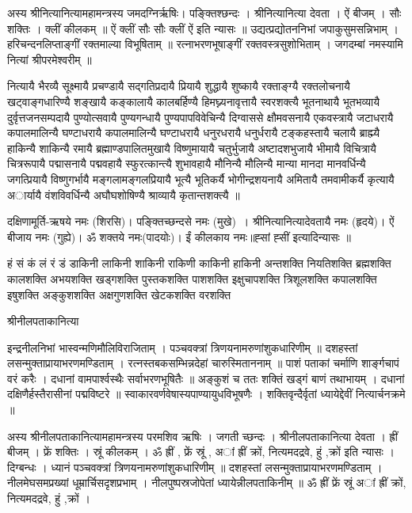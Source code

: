 अस्य श्रीनित्यानित्यामहामन्त्रस्य जमदग्निर्ऋषिः। पङ्क्तिश्छन्दः । श्रीनित्यानित्या देवता । ऐं बीजम् । सौः शक्तिः । क्लीं कीलकम् ॥
ऐं क्लीं सौः सौः क्लीं ऐं  इति न्यासः ॥
उद्यत्प्रद्योतननिभां जपाकुसुमसन्निभाम् । हरिचन्दनलिप्ताङ्गीं रक्तमाल्या विभूषिताम् ॥
रत्नाभरणभूषाङ्गीं रक्तवस्त्रसुशोभिताम् । जगदम्बां नमस्यामि नित्यां श्रीपरमेश्वरीम् ॥

नित्यायै भैरव्यै सूक्ष्मायै प्रचण्डायै सद्गतिप्रदायै प्रियायै शुद्धायै शुष्कायै रक्ताङ्ग्यै रक्तलोचनायै खट्वाङ्गधारिण्यै शङ्खायै कङ्कालायै कालबर्हिण्यै हिमघ्न्यनावृत्तायै स्वरशक्त्यै 
भूतनाथायै भूतभव्यायै दुर्वृत्तजनसम्पदायै पुण्योत्सवायै पुण्यगन्धायै पुण्यपापविवेचिन्यै दिग्वाससे क्षौमवसनायै एकवस्त्रायै जटाधरायै कपालमालिन्यै घण्टाधरायै कपालमालिन्यै घण्टाधरायै धनुरधरायै धनुर्धरायै टङ्कहस्तायै चलायै ब्राह्म्यै हाकिन्यै शाकिन्यै रमायै ब्रह्माण्डपालितमुखायै विष्णुमायायै चतुर्भुजायै अष्टादशभुजायै भीमायै विचित्रायै चित्ररूपायै पद्मासनायै पद्मवहायै स्फुरत्कान्त्यै शुभावहायै मौनिन्यै मौलिन्यै मान्या मानदा मानवर्धिन्यै जगत्प्रियायै विष्णुगर्भायै मङ्गलामङ्गलप्रियायै भूत्यै भूतिकर्यै भोगीन्द्रशयनायै अमितायै तमवामीकर्यै कृत्यायै अार्यायै वंशविवर्धिन्यै अघौघशोषिण्यै श्राव्यायै कृतान्तशक्त्यै ॥

दक्षिणामूर्ति-ऋषये नमः (शिरसि)। पङ्क्तिच्छन्दसे नमः (मुखे)~। श्रीनित्यानित्यादेवतायै नमः (हृदये)। ऐं बीजाय नमः (गुह्ये)। ॐ शक्तये नमः(पादयोः)।
ईं  कीलकाय नमः॥ह्सां ह्सीं इत्यादिन्यासः ॥

हं सं कं लं रं डं 
डाकिनी लाकिनी शाकिनी राकिणी काकिनी हाकिनी अन्तशक्ति नियतिशक्ति ब्रह्मशक्ति कालशक्ति अभयशक्ति खड्गशक्ति पुस्तकशक्ति पाशशक्ति इक्षुचापशक्ति त्रिशूलशक्ति कपालशक्ति इषुशक्ति अङ्कुशशक्ति अक्षगुणशक्ति खेटकशक्ति वरशक्ति 

श्रीनीलपताकानित्या

इन्द्रनीलनिभां भास्वन्मणिमौलिविराजिताम् । पञ्चवक्त्रां त्रिणयनामरुणांशुकधारिणीम् ॥
दशहस्तां लसन्मुक्ताप्रायाभरणमण्डिताम् । रत्नस्तबकसम्भिन्नदेहां चारुस्मिताननाम् ॥
पाशं पताकां चर्माणि शार्ङ्गचापं वरं करैः । दधानां वामपार्श्वस्थैः सर्वाभरणभूषितैः ॥
अङ्कुशं च ततः शक्तिं खड्गं बाणं तथाभायम् । दधानां दक्षिणैर्हस्तैरासीनां पद्मविष्टरे ॥
स्वाकारवर्णवेषास्यपाण्यायुधविभूषणैः । शक्तिवृन्दैर्वृतां ध्यायेद्देवीं नित्यार्चनक्रमे ॥

अस्य श्रीनीलपताकानित्यामहामन्त्रस्य परमशिव ऋषिः । जगती च्छन्दः । श्रीनीलपताकानित्या देवता । ह्रीं बीजम् । फ्रें शक्तिः । स्रूं कीलकम् ।
ॐ ह्रीं , फ्रें स्रूं , अां ह्रीं क्रों, नित्यमदद्रवे, हुं ,क्रों  इति न्यासः । दिग्बन्धः ।
ध्यानं 
पञ्चवक्त्रां त्रिणयनामरुणांशुकधारिणीम् ॥ दशहस्तां लसन्मुक्ताप्रायाभरणमण्डिताम् ।
नीलमेघसमप्रख्यां धूम्रार्चिसदृशप्रभाम् । नीलपुष्पस्रजोपेतां ध्यायेन्नीलपताकिनीम् ॥
ॐ ह्रीं फ्रें स्रूं अां ह्रीं क्रों, नित्यमदद्रवे, हुं ,क्रों  ।

